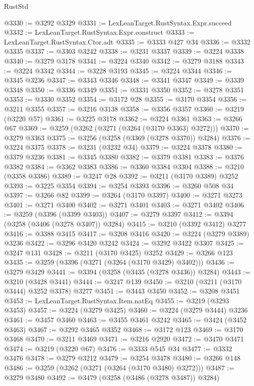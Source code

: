 \begin{lexlean}{RustStd}
\begin{coremodule}
@3330 := @3292 @3329
@3331 := LexLeanTarget.RustSyntax.Expr.succeed
@3332 := LexLeanTarget.RustSyntax.Expr.construct
@3333 := LexLeanTarget.RustSyntax.Ctor.adt
@3335 := @3333 @427 @34
@3336 := @3332 @3335
@3337 := @3303 @3242
@3338 := @3231 @3337
@3339 := @3224 @3338
@3340 := @3279 @3178
@3341 := @3224 @3340
@3342 := @3279 @3188
@3343 := @3224 @3342
@3344 := @3228 @3193
@3345 := @3224 @3344
@3346 := @3345 @3236
@3347 := @3343 @3346
@3348 := @3341 @3347
@3349 := @3339 @3348
@3350 := @3336 @3349
@3351 := @3331 @3350
@3352 := @3278 @3351
@3353 := @3330 @3352
@3354 := @3172 @28
@3355 := @3170 @3354
@3356 := @3211 @3355
@3357 := @3216 @3138
@3358 := @3356 @3357
@3360 := @3219 (@3220 @57)
@3361 := @3225 @3178
@3362 := @3224 @3361
@3363 := @3266 @67
@3369 := @3259 (@3262 (@3271 (@3264 (@3170 @3363) @3272)))
@3370 := @3279 @3363
@3375 := @3256 (@3258 (@3369 (@3278 @3370)) @3284)
@3376 := @3224 @3375
@3378 := @3231 (@3232 @34)
@3379 := @3224 @3378
@3380 := @3379 @3236
@3381 := @3345 @3380
@3382 := @3379 @3381
@3383 := @3376 @3382
@3384 := @3362 @3383
@3386 := @3360 @3384 @3304
@3388 := @3210 (@3358 @3386)
@3389 := @3247 @28
@3392 := @3211 (@3170 @3389) @3252
@3393 := @3225 @3354
@3394 := @3254 @3393
@3396 := @3260 @508 @34
@3397 := @3266 @82
@3399 := @3264 (@3170 @3397)
@3400 := @3271 @3273
@3401 := @3271 @3400
@3402 := @3271 @3401
@3403 := @3271 @3402
@3406 := @3259 (@3396 (@3399 @3403))
@3407 := @3279 @3397
@3412 := @3394 (@3258 (@3406 (@3278 @3407)) @3284)
@3415 := @3210 (@3392 @3412) @3277
@3416 := @3388 @3415
@3417 := @3208 @3416
@3420 := @3224 (@3279 @3389) @3236
@3422 := @3296 @3420 @3242
@3424 := @3292 @3422 @3307
@3425 := @3247 @131
@3428 := @3211 (@3170 @3425) @3252
@3429 := @3266 @123
@3435 := @3259 (@3396 (@3271 (@3264 (@3170 @3429) @3402)))
@3436 := @3279 @3429
@3441 := @3394 (@3258 (@3435 (@3278 @3436)) @3284)
@3443 := @3210 (@3428 @3441)
@3444 := @3247 @139
@3450 := @3210 (@3211 (@3170 @3444) @3252 @3378) @3277
@3451 := @3443 @3450
@3452 := @3208 @3451
@3453 := LexLeanTarget.RustSyntax.Item.natEq
@3455 := @3219 (@3293 @3453)
@3457 := @3224 (@3279 @3425)
@3460 := @3224 (@3279 @3444) @3236
@3461 := @3457 @3460
@3463 := @3455 @3461 @3242
@3465 := @3424 (@3452 @3463)
@3467 := @3292 @3465 @3352
@3468 := @3172 @123
@3469 := @3170 @3468
@3470 := @3211 @3469
@3471 := @3216 @2920
@3472 := @3470 @3471
@3474 := @3219 (@3220 @67)
@3476 := @3333 @545 @34
@3477 := @3332 @3476
@3478 := @3279 @3212
@3479 := @3254 @3478
@3480 := @3266 @148
@3486 := @3259 (@3262 (@3271 (@3264 (@3170 @3480) @3272)))
@3487 := @3279 @3480
@3492 := @3479 (@3258 (@3486 (@3278 @3487)) @3284)

\end{coremodule}
\end{lexlean}
